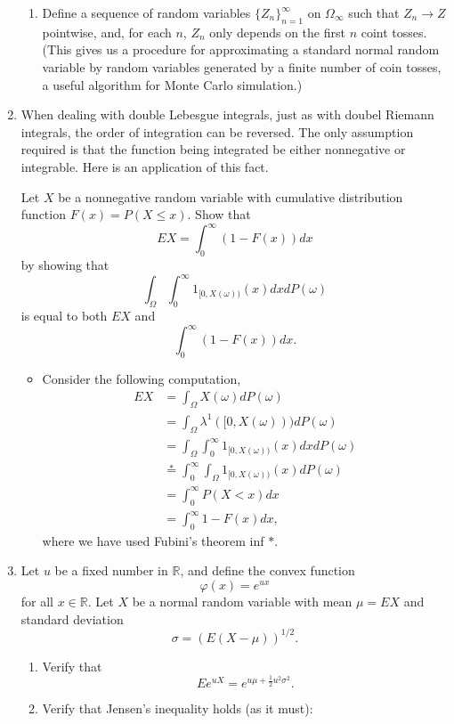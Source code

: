 \documentclass{article}
\begin{document}
\begin{enumerate}
\begin{enumerate}
			\item Define a sequence of random variables $\{Z_n\}_{n = 1}^\infty$ on $\Omega_\infty$ such that $Z_n \rightarrow Z$ pointwise, and, for each $n$, $Z_n$ only depends on the first $n$ coint tosses. (This gives us a procedure for approximating a standard normal random variable by random variables generated by a finite number of coin tosses, a useful algorithm for Monte Carlo simulation.)
		\end{enumerate}
	\item When dealing with double Lebesgue integrals, just as with doubel Riemann integrals, the order of integration can be reversed. The only assumption required is that the function being integrated be either nonnegative or integrable. Here is an application of this fact.

	Let $X$ be a nonnegative random variable with cumulative distribution function $F(x) = P(X \leq x)$. Show that
	$$
	EX = \int_0^\infty (1 - F(x)) dx
	$$
	by showing that
	$$
	\int_\Omega \int_0^\infty 1_{[0, X(\omega))}(x) dx dP(\omega)
	$$
	is equal to both $EX$ and
	$$
	\int_0^\infty (1 - F(x))dx.
 	$$
 		\begin{itemize}
 			\item Consider the following computation,
 			$$
 			\begin{aligned}
 			EX &= \int_\Omega X(\omega) dP(\omega) \\
 			&= \int_\Omega \lambda^1([0, X(\omega))) dP(\omega) \\
 			&= \int_\Omega \int_0^\infty 1_{[0, X(\omega))}(x) dx dP(\omega) \\
 			&\overset{*}{=} \int_0^\infty \int_\Omega 1_{[0, X(\omega))}(x) dP(\omega) \\
 			&= \int_0^\infty P(X < x) dx \\
 			&= \int_0^\infty 1 - F(x) dx,
 			\end{aligned}
 			$$
 			where we have used Fubini's theorem inf $*$.
		\end{itemize}
 	\item Let $u$ be a fixed number in $\mathbb{R}$, and define the convex function
 	$$
 	\varphi(x) = e^{ux}
 	$$
 	for all $x \in \mathbb{R}$. Let $X$ be a normal random variable with mean $\mu = EX$ and standard deviation
 	$$
 	\sigma = (E(X - \mu))^{1 / 2}.
 	$$
 	\begin{enumerate}
 		\item Verify that
 		$$
 		Ee^{uX} = e^{u\mu + \frac{1}{2} u^2 \sigma^2}.
 		$$
 		\item Verify that Jensen's inequality holds (as it must):

\end{enumerate}
\end{enumerate}
\end{document}
